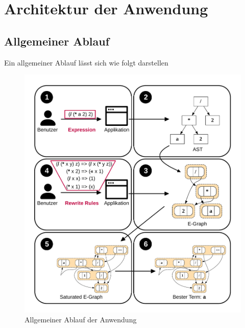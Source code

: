 \section{Architektur der Anwendung}\label{sec:architektur}

\subsection{Allgemeiner Ablauf}

Ein allgemeiner Ablauf lässt sich wie folgt darstellen

\begin{figure}[h]
  \includegraphics[width=\textwidth]{../fig/ablauf.pdf}
  \caption{Allgemeiner Ablauf der Anwendung}
  \label{fig:ablauf}
\end{figure}
